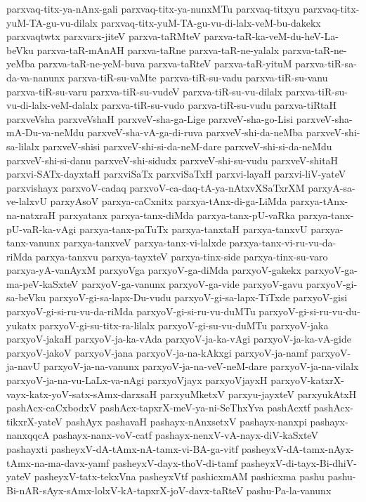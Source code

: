 {parxvaq-titx-ya-nAnx-gali
parxvaq-titx-ya-nunxMTu
parxvaq-titxyu
parxvaq-titx-yuM-TA-gu-vu-dilalx
parxvaq-titx-yuM-TA-gu-vu-di-lalx-veM-bu-dakekx
parxvaqtwtx
parxvarx-jiteV
parxva-taRMteV
parxva-taR-ka-veM-du-heV-La-beVku
parxva-taR-mAnAH
parxva-taRne
parxva-taR-ne-yalalx
parxva-taR-ne-yeMba
parxva-taR-ne-yeM-buva
parxva-taRteV
parxva-taR-yituM
parxva-tiR-sa-da-va-nanunx
parxva-tiR-su-vaMte
parxva-tiR-su-vadu
parxva-tiR-su-vanu
parxva-tiR-su-varu
parxva-tiR-su-vudeV
parxva-tiR-su-vu-dilalx
parxva-tiR-su-vu-di-lalx-veM-dalalx
parxva-tiR-su-vudo
parxva-tiR-su-vudu
parxva-tiRtaH
parxveVsha
parxveVshaH
parxveV-sha-ga-Lige
parxveV-sha-go-Lisi
parxveV-sha-mA-Du-va-neMdu
parxveV-sha-vA-ga-di-ruva
parxveV-shi-da-neMba
parxveV-shi-sa-lilalx
parxveV-shisi
parxveV-shi-si-da-neM-dare
parxveV-shi-si-da-neMdu
parxveV-shi-si-danu
parxveV-shi-sidudx
parxveV-shi-su-vudu
parxveV-shitaH
parxvi-SATx-dayxtaH
parxviSaTx
parxviSaTxH
parxvi-layaH
parxvi-liV-yateV
parxvishayx
parxvoV-cadaq
parxvoV-ca-daq-tA-ya-nAtxvXSaTxrXM
parxyA-sa-ve-lalxvU
parxyAsoV
parxya-caCxnitx
parxya-tAnx-di-ga-LiMda
parxya-tAnx-na-natxraH
parxyatanx
parxya-tanx-diMda
parxya-tanx-pU-vaRka
parxya-tanx-pU-vaR-ka-vAgi
parxya-tanx-paTuTx
parxya-tanxtaH
parxya-tanxvU
parxya-tanx-vanunx
parxya-tanxveV
parxya-tanx-vi-lalxde
parxya-tanx-vi-ru-vu-da-riMda
parxya-tanxvu
parxya-tayxteV
parxya-tinx-side
parxya-tinx-su-varo
parxya-yA-vanAyxM
parxyoVga
parxyoV-ga-diMda
parxyoV-gakekx
parxyoV-ga-ma-peV-kaSxteV
parxyoV-ga-vanunx
parxyoV-ga-vide
parxyoV-gavu
parxyoV-gi-sa-beVku
parxyoV-gi-sa-lapx-Du-vudu
parxyoV-gi-sa-lapx-TiTxde
parxyoV-gisi
parxyoV-gi-si-ru-vu-da-riMda
parxyoV-gi-si-ru-vu-duMTu
parxyoV-gi-si-ru-vu-du-yukatx
parxyoV-gi-su-titx-ra-lilalx
parxyoV-gi-su-vu-duMTu
parxyoV-jaka
parxyoV-jakaH
parxyoV-ja-ka-vAda
parxyoV-ja-ka-vAgi
parxyoV-ja-ka-vA-gide
parxyoV-jakoV
parxyoV-jana
parxyoV-ja-na-kAkxgi
parxyoV-ja-namf
parxyoV-ja-navU
parxyoV-ja-na-vanunx
parxyoV-ja-na-veV-neM-dare
parxyoV-ja-na-vilalx
parxyoV-ja-na-vu-LaLx-va-nAgi
parxyoVjayx
parxyoVjayxH
parxyoV-katxrX-vayx-katx-yoV-satx-sAmx-darxsaH
parxyuMketxV
parxyu-jayxteV
parxyukAtxH
pashAcx-caCxbodxV
pashAcx-tapxrX-meV-ya-ni-SeThxYva
pashAcxtf
pashAcx-tikxrX-yateV
pashAyx
pashavaH
pashayx-nAnxsetxV
pashayx-nanxpi
pashayx-nanxqqcA
pashayx-nanx-voV-catf
pashayx-nenxV-vA-nayx-diV-kaSxteV
pashayxti
pasheyxV-dA-tAmx-nA-tamx-vi-BA-ga-vitf
pasheyxV-dA-tamx-nAyx-tAmx-na-ma-davx-yamf
pasheyxV-dayx-thoV-di-tamf
pasheyxV-di-tayx-Bi-dhiV-yateV
pasheyxV-tatx-tekxVna
pasheyxVtf
pashicxmAM
pashicxma
pashu
pashu-Bi-nAR-sAyx-sAmx-lolxV-kA-tapxrX-joV-davx-taRteV
pashu-Pa-la-vanunx
}

